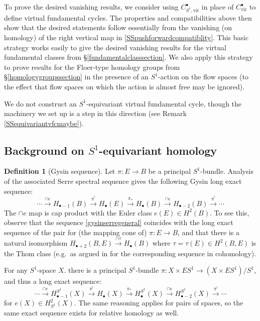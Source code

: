 \documentclass[12pt]{article}
\theoremstyle{definition}
\newtheorem{definition}[theorem]{Definition}
\theoremstyle{remark}
\numberwithin{equation}{subsection}
\newcommand{\vir}{\mathrm{vir}}
\begin{document}
To prove the desired vanishing results, we consider using $C^\bullet_{S^1,\vir}$ in place of $C^\bullet_\vir$ to define virtual fundamental cycles.  The properties and compatibilities above then show that the desired statements follow essentially from the vanishing (on homology) of the right vertical map in \eqref{SSpushforwardcompatiblity}.  This basic strategy works easily to give the desired vanishing results for the virtual fundamental classes from \S\ref{fundamentalclasssection}.  We also apply this strategy to prove results for the Floer-type homology groups from \S\ref{homologygroupssection} in the presence of an $S^1$-action on the flow spaces (to the effect that flow spaces on which the action is almost free may be ignored).

We do not construct an $S^1$-equivariant virtual fundamental cycle, though the machinery we set up is a step in this direction (see Remark \ref{SSequivariantvfcmaybe}).

\subsection{Background on \texorpdfstring{$S^1$}{S{\textasciicircum}1}-equivariant homology}

\begin{definition}[Gysin sequence]
Let $\pi:E\to B$ be a principal $S^1$-bundle.  Analysis of the associated Serre spectral sequence gives the following Gysin long exact sequence:
\begin{equation}\label{gysinserregeneral}
\cdots\xrightarrow{\cap e}H_{\bullet-1}(B)\xrightarrow{\pi^!}H_\bullet(E)\xrightarrow{\pi_\ast}H_\bullet(B)\xrightarrow{\cap e}H_{\bullet-2}(B)\xrightarrow{\pi^!}\cdots
\end{equation}
The $\cap e$ map is cap product with the Euler class $e(E)\in H^2(B)$.  To see this, observe that the sequence \eqref{gysinserregeneral} coincides with the long exact sequence of the pair for (the mapping cone of) $\pi:E\to B$, and that there is a natural isomorphism $H_{\bullet+2}(B,E)\xrightarrow{\cap\tau}H_\bullet(B)$ where $\tau=\tau(E)\in H^2(B,E)$ is the Thom class (e.g.\ as argued in \cite[p444]{hatcher} for the corresponding sequence in cohomology).

For any $S^1$-space $X$. there is a principal $S^1$-bundle $\pi:X\times ES^1\to(X\times ES^1)/S^1$, and thus a long exact sequence:
\begin{equation}\label{gysinserre}
\cdots\xrightarrow{\cap e}H_{\bullet-1}^{S^1}(X)\xrightarrow{\pi^!}H_\bullet(X)\xrightarrow{\pi_\ast}H_\bullet^{S^1}(X)\xrightarrow{\cap e}H_{\bullet-2}^{S^1}(X)\xrightarrow{\pi^!}\cdots
\end{equation}
for $e(X)\in H^2_{S^1}(X)$.  The same reasoning applies for pairs of spaces, so the same exact sequence exists for relative homology as well.
\end{definition}
\end{document}
